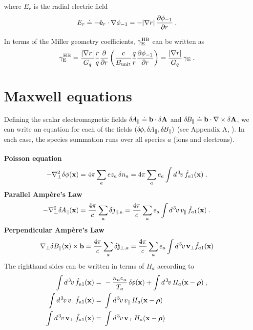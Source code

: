 \noindent
where $E_r$ is the radial electric field 
%
\begin{equation}
E_r \doteq - \hat{\mathbf{e}}_r \cdot \nabla \phi_{-1} 
    = - |\nabla r| \, \frac{\partial\phi_{-1}}{\partial r} \; . 
\end{equation}

\noindent
In terms of the Miller geometry coefficients, 
$\gamma_{\rm E}^{\rm HB}$ can be written as 
%
\begin{equation}
\gamma_{\rm E}^{\rm HB} = 
  \frac{|\nabla r|}{G_q} \frac{r}{q} \frac{\partial}{\partial r} 
  \left( \frac{c}{B_{\rm unit}} \frac{q}{r} \frac{\partial \phi_{-1}}{\partial r} 
  \right) = 
   \frac{|\nabla r|}{G_q} \, \gamma_{\rm E} \; .
\end{equation}

\section{Maxwell equations}

Defining the scalar electromagnetic fields $\delta \hskip -1pt A_\parallel \doteq \mathbf{b} \cdot \delta {\bf A}$ 
and $\delta \hskip -1pt B_\parallel \doteq \mathbf{b} \cdot \nabla \times \delta {\bf A}$, we can write an 
equation for each of the fields $(\delta \hskip -1pt \phi,\delta \hskip -1pt A_\parallel,\delta \hskip -1pt B_\parallel)$ (see Appendix A, 
\cite{sugama:1998}).  In each case, the species summation runs over all 
species $a$ (ions and electrons).\\
\\
%
{\bf Poisson equation}
%
\begin{equation}
-\nabla_\perp^2 \delta\phi(\mathbf{x}) = 4\pi \sum_a e z_a \, \delta n_a 
  = 4\pi \sum_a e_a \int d^{\hskip 1pt 3} \hskip -1pt v \, {\hat f}_{a1}(\mathbf{x}) \; .
\end{equation}
%
{\bf Parallel Amp\`ere's Law}
%
\begin{equation}
-\nabla_\perp^2 \delta \hskip -1pt A_\parallel(\mathbf{x}) = \frac{4\pi}{c} \sum_a \delta j_{\parallel,a} = 
\frac{4\pi}{c} \sum_a e_a \int d^{\hskip 1pt 3} \hskip -1pt v \, v_\parallel \, {\hat f}_{a1}(\mathbf{x}) \; .
\end{equation}
%
{\bf Perpendicular Amp\`ere's Law}
%
\begin{equation}
\nabla_\perp \delta B_\parallel(\mathbf{x}) \times \mathbf{b} 
= \frac{4 \pi}{c} \sum_a \delta {\bf j}_{\perp,a}
= \frac{4 \pi}{c} \sum_a 
e_a \int d^{\hskip 1pt 3} \hskip -1pt v \, \mathbf{v}_\perp {\hat f}_{a1}(\mathbf{x}) 
\end{equation}
%
The righthand sides can be written in terms of $H_a$ according to
%
\begin{align}
\int d^{\hskip 1pt 3} \hskip -1pt v \, {\hat f}_{a1}(\mathbf{x}) = &~ -\frac{n_a e_a}{T_a} \, \delta \hskip -1pt \phi(\mathbf{x}) + 
\int d^{\hskip 1pt 3} \hskip -1pt v \, H_a(\mathbf{x}-\boldsymbol{\rho}) \; , \\
\int d^{\hskip 1pt 3} \hskip -1pt v \, v_\parallel \, {\hat f}_{a1}(\mathbf{x}) = &~ \int d^{\hskip 1pt 3} \hskip -1pt v \, v_\parallel \, H_a(\mathbf{x}-\boldsymbol{\rho}) \\
\int d^{\hskip 1pt 3} \hskip -1pt v \, \mathbf{v}_\perp \, {\hat f}_{a1}(\mathbf{x}) = &~ \int d^{\hskip 1pt 3} \hskip -1pt v \, 
 \mathbf{v}_\perp \, H_a(\mathbf{x}-\boldsymbol{\rho})
\end{align}

